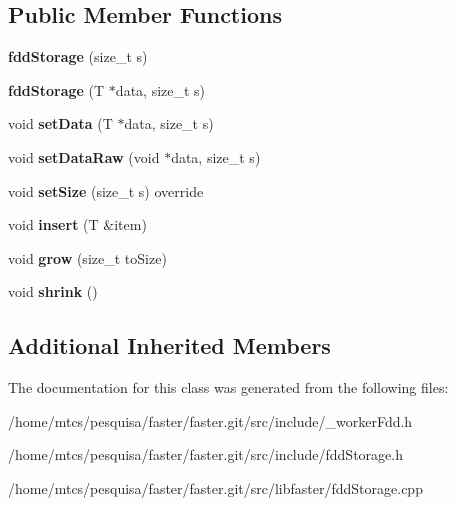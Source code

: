 \subsection*{Public Member Functions}
\begin{DoxyCompactItemize}
\item 
\hypertarget{classfaster_1_1fddStorage_a64a6657ec7779098209f214e9eb0dcbf}{}\label{classfaster_1_1fddStorage_a64a6657ec7779098209f214e9eb0dcbf} 
{\bfseries fdd\+Storage} (size\+\_\+t s)
\item 
\hypertarget{classfaster_1_1fddStorage_ac559d1855128c84e2afecad11e6c544e}{}\label{classfaster_1_1fddStorage_ac559d1855128c84e2afecad11e6c544e} 
{\bfseries fdd\+Storage} (T $\ast$data, size\+\_\+t s)
\item 
\hypertarget{classfaster_1_1fddStorage_ab766932e5707c5e89811848024e4d8ca}{}\label{classfaster_1_1fddStorage_ab766932e5707c5e89811848024e4d8ca} 
void {\bfseries set\+Data} (T $\ast$data, size\+\_\+t s)
\item 
\hypertarget{classfaster_1_1fddStorage_aae86c7f166895c3bcb4da4dfd0029856}{}\label{classfaster_1_1fddStorage_aae86c7f166895c3bcb4da4dfd0029856} 
void {\bfseries set\+Data\+Raw} (void $\ast$data, size\+\_\+t s)
\item 
\hypertarget{classfaster_1_1fddStorage_a11e678410ee62756860b55073d89ee2f}{}\label{classfaster_1_1fddStorage_a11e678410ee62756860b55073d89ee2f} 
void {\bfseries set\+Size} (size\+\_\+t s) override
\item 
\hypertarget{classfaster_1_1fddStorage_aae02a1cfeb1845ab9f7e347fbafcb791}{}\label{classfaster_1_1fddStorage_aae02a1cfeb1845ab9f7e347fbafcb791} 
void {\bfseries insert} (T \&item)
\item 
\hypertarget{classfaster_1_1fddStorage_aa0e4fd7ae90d85ff2f1b4654c2bf0960}{}\label{classfaster_1_1fddStorage_aa0e4fd7ae90d85ff2f1b4654c2bf0960} 
void {\bfseries grow} (size\+\_\+t to\+Size)
\item 
\hypertarget{classfaster_1_1fddStorage_a919925ed678dad9b556d9cdc4974d4a9}{}\label{classfaster_1_1fddStorage_a919925ed678dad9b556d9cdc4974d4a9} 
void {\bfseries shrink} ()
\end{DoxyCompactItemize}
\subsection*{Additional Inherited Members}


The documentation for this class was generated from the following files\+:\begin{DoxyCompactItemize}
\item 
/home/mtcs/pesquisa/faster/faster.\+git/src/include/\+\_\+worker\+Fdd.\+h\item 
/home/mtcs/pesquisa/faster/faster.\+git/src/include/fdd\+Storage.\+h\item 
/home/mtcs/pesquisa/faster/faster.\+git/src/libfaster/fdd\+Storage.\+cpp\end{DoxyCompactItemize}
